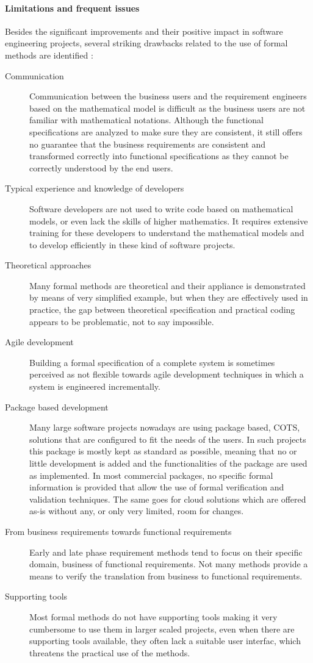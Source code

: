 \paragraph{Limitations and frequent issues}
\label{sec:drawbacks}
Besides the significant improvements and their positive impact in software engineering projects, several striking drawbacks related to the use of formal methods are identified :
\begin{description}
	\item[Communication] Communication between the business users and the requirement engineers based on the mathematical model is difficult as the business users are not familiar with mathematical notations. Although the functional specifications are analyzed to make sure they are consistent, it still offers no guarantee that the business requirements are consistent and transformed correctly into functional specifications as they cannot be correctly understood by the end users.
	\item[Typical experience and knowledge of developers] Software developers are not used to write code based on mathematical models, or even lack the skills of higher mathematics. It requires extensive training for these developers to understand the mathematical models and to develop efficiently in these kind of software projects.
	\item[Theoretical approaches] Many formal methods are theoretical and their appliance is demonstrated by means of very simplified example, but when they are effectively used in practice, the gap between theoretical specification and practical coding appears to be problematic, not to say impossible.
	\item[Agile development] Building a formal specification of a complete system is sometimes perceived as not flexible towards agile development techniques in which a system is engineered incrementally. 
	\item[Package based development] Many large software projects nowadays are using package ba\-sed, COTS, solutions that are configured to fit the needs of the users. In such projects this package is mostly kept as standard as possible, meaning that no or little development is added and the functionalities of the package are used as implemented. In most commercial packages, no specific formal information is provided that allow the use of formal verification and validation techniques. The same goes for cloud solutions which are offered as-is without any, or only very limited, room for changes.
	\item[From business requirements towards functional requirements] Early and late phase requi\-rement methods tend to focus on their specific domain, business of functional requirements.
	Not many methods provide a means to verify the translation from business to functional requirements.
	\item[Supporting tools] Most formal methods do not have supporting tools making it very cumbersome to use them in larger scaled projects, even when there are supporting tools available, they often lack a suitable user interfac, which threatens the practical use of the methods.


\end{description}
